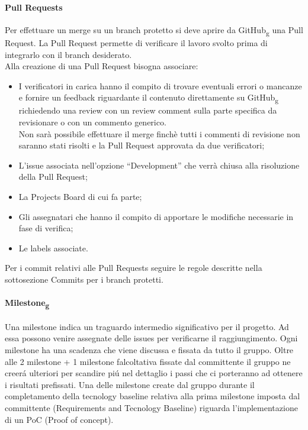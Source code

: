 \paragraph{Pull Requests}
Per effettuare un merge su un branch protetto si deve aprire da GitHub\textsubscript{g} una Pull Request.
La Pull Request permette di verificare il lavoro svolto prima di integrarlo con il branch desiderato.\\
Alla creazione di una Pull Request bisogna associare:
\begin{itemize}
\item I verificatori in carica hanno il compito di trovare eventuali errori o mancanze e fornire un feedback riguardante il contenuto direttamente su GitHub\textsubscript{g} richiedendo
una review con un review comment sulla parte specifica da revisionare o con un commento generico.\\
Non sarà possibile effettuare il merge finchè tutti i commenti di revisione non saranno stati risolti e la Pull Request approvata da due verificatori;
\item L’issue associata nell’opzione “Development” che verrà chiusa alla risoluzione della Pull Request;
\item La Projects Board di cui fa parte;
\item Gli assegnatari che hanno il compito di apportare le modifiche necessarie in fase di verifica;
\item Le labels associate.
\end{itemize}
Per i commit relativi alle Pull Requests seguire le regole descritte nella sottosezione Commits per i branch protetti.

\paragraph{Milestone\textsubscript{g}}
Una milestone indica un traguardo intermedio significativo per il progetto.
Ad essa possono venire assegnate delle issues per verificarne il raggiungimento.
Ogni milestone ha una scadenza che viene discussa e fissata da tutto il gruppo.
Oltre alle 2 milestone + 1 milestone falcoltativa fissate dal committente il gruppo ne creerá ulteriori per scandire piú nel dettaglio i passi che ci porteranno 
ad ottenere i risultati prefissati.
Una delle milestone create dal gruppo durante il completamento della tecnology baseline relativa alla prima milestone imposta dal committente (Requirements and Tecnology Baseline)
riguarda l'implementazione di un PoC (Proof of concept).

